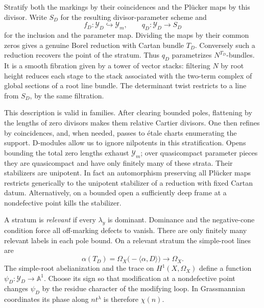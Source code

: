 \documentclass[11pt]{article}
\numberwithin{equation}{section}
\theoremstyle{definition}
\theoremstyle{remark}
\begin{document}
Stratify both the markings by their coincidences and the Pl\"ucker maps by
this divisor. Write $S_D$ for the resulting divisor-parameter scheme and
\[
 f_D:\mathcal Y_D\hookrightarrow\mathcal Y_m,\qquad
 q_D:\mathcal Y_D\longrightarrow S_D
\]
for the inclusion and the parameter map. Dividing the maps by their common
zeros gives a genuine Borel reduction with Cartan bundle $T_D$.
Conversely such a reduction recovers the point of the stratum. Thus
$q_D$ parametrizes $N^{T_D}$-bundles. It is a smooth fibration given by a
tower of vector stacks: filtering $N$ by root height reduces each stage
to the stack associated with the two-term complex of global sections of
a root line bundle. The determinant twist restricts to a line from $S_D$,
by the same filtration.

This description is valid in families. After clearing bounded poles,
flattening by the lengths of zero divisors makes them relative Cartier
divisors. One then refines by coincidences, and, when needed, passes to
\'etale charts enumerating the support. D-modules allow us to ignore
nilpotents in this stratification. Opens bounding the total zero lengths
exhaust $\mathcal Y_m$; over quasicompact parameter pieces they are
quasicompact and have only finitely many of these strata. Their
stabilizers are unipotent. In fact an automorphism preserving all
Pl\"ucker maps restricts generically to the unipotent stabilizer of a
reduction with fixed Cartan datum. Alternatively, on a bounded open a
sufficiently deep frame at a nondefective point kills the stabilizer.

A stratum is \emph{relevant} if every $\lambda_y$ is dominant. Dominance
and the negative-cone condition force all off-marking defects to vanish.
There are only finitely many relevant labels in each pole bound.
On a relevant stratum the simple-root lines are
\[
 \alpha(T_D)=\Omega_X\bigl(-\langle\alpha,D\rangle\bigr)
 \longrightarrow\Omega_X.
\]
The simple-root abelianization and the trace on $H^1(X,\Omega_X)$ define a
function $\psi_D:\mathcal Y_D\to\mathbb A^1$. Choose its sign so that
modification at a nondefective point changes $\psi_D$ by the residue
character of the modifying loop. In Grassmannian coordinates its phase
along $nt^\lambda$ is therefore $\chi(n)$.
\end{document}
